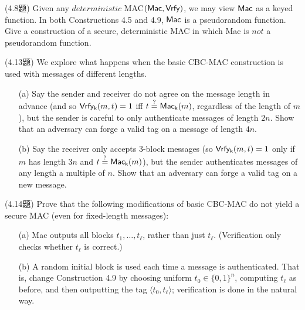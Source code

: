 \begin{questions}
        \begin{solution}
        \end{solution}

    \question (4.8题) Given any $deterministic$ MAC$(\mathsf{Mac},\mathsf{Vrfy})$, we may view $\mathsf{Mac}$ as a keyed function. In both Constructions 4.5 and 4.9, $\mathsf{Mac}$ is a pseudorandom function. Give a construction of a secure, deterministic MAC in which Mac is $not$ a pseudorandom function.

        \begin{solution}
        \end{solution}

    \question (4.13题) We explore what happens when the basic CBC-MAC construction is used with messages of different lengths.

        \begin{enumerate}
            \item[(a)] Say the sender and receiver do not agree on the message length in advance (and so $\mathsf{Vrfy_k}(m,t)=1$ iff $t\overset{?}{=}\mathsf{Mac_k}(m)$, regardless of the length of $m$), but the sender is careful to only authenticate messages of length $2n$. Show that an adversary can forge a valid tag on a message of length $4n$.
            \item[(b)] Say the receiver only accepts 3-block messages (so $\mathsf{Vrfy_k}(m,t)=1$ only if $m$ has length $3n$ and $t\overset{?}{=}\mathsf{Mac_k}(m)$), but the sender authenticates messages of any length a multiple of $n$. Show that an adversary can forge a valid tag on a new message.
        \end{enumerate}

        \begin{solution}
        \end{solution}

    \question (4.14题) Prove that the following modifications of basic CBC-MAC do not yield a secure MAC (even for fixed-length messages):

        \begin{enumerate}
            \item[(a)] Mac outputs all blocks $t_1,\dots,t_\ell$, rather than just $t_\ell$. (Verification only checks whether $t_\ell$ is correct.)
            \item[(b)] A random initial block is used each time a message is authenticated. That is, change Construction 4.9 by choosing uniform $t_0\in\{0,1\}^n$, computing $t_\ell$ as before, and then outputting the tag $\langle{t_0,t_\ell}\rangle$; verification is done in the natural way.
        \end{enumerate}


\end{questions}
